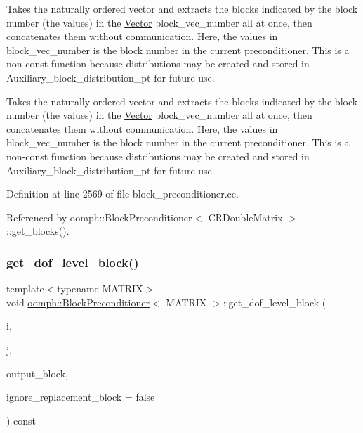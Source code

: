 Takes the naturally ordered vector and extracts the blocks indicated by the block number (the values) in the \hyperlink{classoomph_1_1Vector}{Vector} block\+\_\+vec\+\_\+number all at once, then concatenates them without communication. Here, the values in block\+\_\+vec\+\_\+number is the block number in the current preconditioner. This is a non-\/const function because distributions may be created and stored in Auxiliary\+\_\+block\+\_\+distribution\+\_\+pt for future use. 

Takes the naturally ordered vector and extracts the blocks indicated by the block number (the values) in the \hyperlink{classoomph_1_1Vector}{Vector} block\+\_\+vec\+\_\+number all at once, then concatenates them without communication. Here, the values in block\+\_\+vec\+\_\+number is the block number in the current preconditioner. This is a non-\/const function because distributions may be created and stored in Auxiliary\+\_\+block\+\_\+distribution\+\_\+pt for future use. 

Definition at line 2569 of file block\+\_\+preconditioner.\+cc.



Referenced by oomph\+::\+Block\+Preconditioner$<$ C\+R\+Double\+Matrix $>$\+::get\+\_\+blocks().

\mbox{\label{classoomph_1_1BlockPreconditioner_a314fc14d95f2833be66067cd5b45e093}} 
\subsubsection{\texorpdfstring{get\+\_\+dof\+\_\+level\+\_\+block()}{get\_dof\_level\_block()}\hspace{0.1cm}{\footnotesize\ttfamily [1/2]}}
{\footnotesize\ttfamily template$<$typename M\+A\+T\+R\+IX$>$ \\
void \hyperlink{classoomph_1_1BlockPreconditioner}{oomph\+::\+Block\+Preconditioner}$<$ M\+A\+T\+R\+IX $>$\+::get\+\_\+dof\+\_\+level\+\_\+block (\begin{DoxyParamCaption}\item[{const unsigned \&}]{i,  }\item[{const unsigned \&}]{j,  }\item[{M\+A\+T\+R\+IX \&}]{output\+\_\+block,  }\item[{const bool \&}]{ignore\+\_\+replacement\+\_\+block = {\ttfamily false} }\end{DoxyParamCaption}) const}




